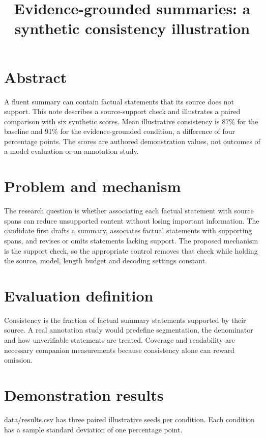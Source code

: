 \documentclass{article}
\title{Evidence-grounded summaries: a synthetic consistency illustration}
\author{}
\date{}
\begin{document}
\maketitle

\section*{Abstract}

A fluent summary can contain factual statements that its source does not support. This note describes a source-support check and illustrates a paired comparison with six synthetic scores. Mean illustrative consistency is 87\% for the baseline and 91\% for the evidence-grounded condition, a difference of four percentage points. The scores are authored demonstration values, not outcomes of a model evaluation or an annotation study.

\section*{Problem and mechanism}

The research question is whether associating each factual statement with source spans can reduce unsupported content without losing important information. The candidate first drafts a summary, associates factual statements with supporting spans, and revises or omits statements lacking support. The proposed mechanism is the support check, so the appropriate control removes that check while holding the source, model, length budget and decoding settings constant.

\section*{Evaluation definition}

Consistency is the fraction of factual summary statements supported by their source. A real annotation study would predefine segmentation, the denominator and how unverifiable statements are treated. Coverage and readability are necessary companion measurements because consistency alone can reward omission.

\section*{Demonstration results}

data/results.csv has three paired illustrative seeds per condition. Each condition has a sample standard deviation of one percentage point.
\end{document}

